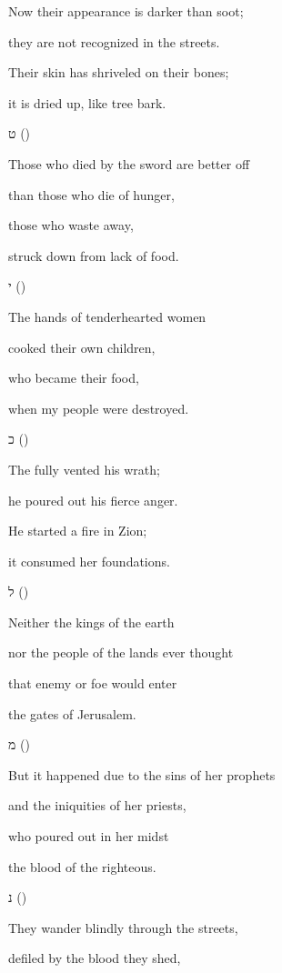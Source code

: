 {\par }{\Q {}Now their appearance is darker than soot;
\par }{\Q they are not recognized in the streets.
\par }{\Q Their skin has shriveled on their bones;
\par }{\Q it is dried up, like tree bark.
\par }{\SH ט ({})
\par }{\Q {}Those who died by the sword are better off
\par }{\Q than those who die of hunger,
\par }{\Q those who waste away,
\par }{\Q struck down from lack of food.
\par }{\SH י ({})
\par }{\Q {}The hands of tenderhearted women
\par }{\Q cooked their own children,
\par }{\Q who became their food,
\par }{\Q when my people were destroyed.
\par }{\SH כ ({})
\par }{\Q {}The
{} fully vented his wrath;
\par }{\Q he poured out his fierce anger.
\par }{\Q He started a fire in Zion;
\par }{\Q it consumed her foundations.
\par }{\SH ל ({})
\par }{\Q {}Neither the kings of the earth
\par }{\Q nor the people of the lands ever thought
\par }{\Q that enemy or foe would enter
\par }{\Q the gates of Jerusalem.
\par }{\SH מ ({})
\par }{\Q {}But it happened due to the sins of her prophets
\par }{\Q and the iniquities of her priests,
\par }{\Q who poured out in her midst
\par }{\Q the blood of the righteous.
\par }{\SH נ ({})
\par }{\Q {}They wander blindly through the streets,
\par }{\Q defiled by the blood they shed,
}
